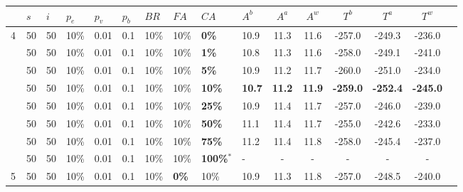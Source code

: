 \begin{sidewaystable}
    \centering
    \begin{tabular}{|l|l|l|l|l|l|l|l|l|l||c|c|c|c|c|c|}
    \hline
    ~ & $s$ & $i$ & $p_{e}$ & $p_{v}$ & $p_{b}$ & $BR$ & $FA$ & $CA$ & $A^b$ & $A^a$ & $A^w$ & $T^b$ & $T^a$ & $T^w$\\
    \hline
    4 & 50 & 50 & 10\% & 0.01 & 0.1 & 10\% & 10\% & \textbf{0\%} & 10.9 & 11.3 & 11.6 & -257.0 & -249.3 & -236.0 \\
    ~ & 50 & 50 & 10\% & 0.01 & 0.1 & 10\% & 10\% & \textbf{1\%} & 10.8 & 11.3 & 11.6 & -258.0 & -249.1 & -241.0 \\
    ~ & 50 & 50 & 10\% & 0.01 & 0.1 & 10\% & 10\% & \textbf{5\%} &  10.9 & 11.2 & 11.7 & -260.0 & -251.0 & -234.0 \\
    ~ & 50 & 50 & 10\% & 0.01 & 0.1 & 10\% & 10\% & \textbf{10\%} & \textbf{10.7} & \textbf{11.2} & \textbf{11.9} & \textbf{-259.0} & \textbf{-252.4} & \textbf{-245.0} \\
    ~ & 50 & 50 & 10\% & 0.01 & 0.1 & 10\% & 10\% & \textbf{25\%} & 10.9 & 11.4 & 11.7 & -257.0 & -246.0 & -239.0 \\
    ~ & 50 & 50 & 10\% & 0.01 & 0.1 & 10\% & 10\% & \textbf{50\%} & 11.1 & 11.4 & 11.7 & -255.0 & -242.6 & -233.0 \\
    ~ & 50 & 50 & 10\% & 0.01 & 0.1 & 10\% & 10\% & \textbf{75\%} & 11.2 & 11.4 & 11.8 & -258.0 & -245.4 & -237.0 \\
    ~ & 50 & 50 & 10\% & 0.01 & 0.1 & 10\% & 10\% & \textbf{100\%$^*$} & - & - & - & - & - & - \\
    \hline
    5 & 50 & 50 & 10\% & 0.01 & 0.1 & 10\% & \textbf{0\%} & 10\% & 10.9 & 11.3 & 11.8 & -257.0 & -248.5 & -240.0 \\

\end{tabular}
\end{sidewaystable}
